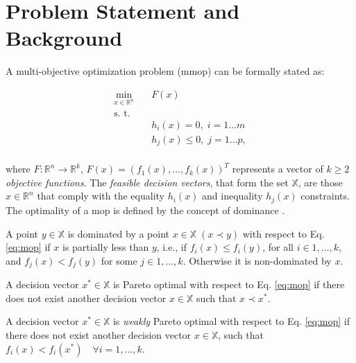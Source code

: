 \section{Problem Statement and Background}
\label{sec:background}

A multi-objective optimization problem (\gls{mmop}) can be formally stated as:

\begin{equation}
	\begin{aligned}
	\underset{x \in \mathbb{R}^n}{\text{min}}
	& \quad F(x)\\
	\text{s. t.} \\
	& \quad h_i(x) = 0, \; i = 1 \ldots m\\
	& \quad h_j(x) \leq 0, \; j = 1 \ldots p,\\
	\end{aligned}
	\label{eq:mop}
\end{equation}

\noindent where $F:\mathbb{R}^n \rightarrow \mathbb{R}^k$, $F(x) = (f_1(x), \ldots,f_k(x))^T$ represents a vector of $k \geq 2$ \emph{objective functions}. The \emph{feasible decision vectors}, that form the set $\mathbb{X}$, are those $x \in \mathbb{R}^{n}$ that comply with the equality $h_i(x)$ and inequality $h_j(x)$ constraints.\\

The optimality of a \gls{mop} is defined by the concept of dominance \cite{pareto_set}.

\begin{mydef}
A point $y \in \mathbb{X}$ is dominated by a point  $x \in \mathbb{X} \; (x \prec y)$ with respect to Eq. \eqref{eq:mop} if $x$ is partially less than $y$, i.e., if $f_{i}(x) \leq f_{i}(y)$, for all $i \in 1, \ldots, k$, and $f_{j}(x) < f_{j}(y)$ for some $j \in 1, \ldots, k$. Otherwise it is non-dominated by $x$. 
\end{mydef}

\begin{mydef}
A decision vector $x^{*} \in \mathbb{X}$ is Pareto optimal with respect to Eq. \eqref{eq:mop} if there does not exist another decision vector $x \in \mathbb{X}$ such that  $x \prec x^{*}$.
\end{mydef}

\begin{mydef}
A decision vector $x^{*} \in \mathbb{X}$ is \emph{weakly} Pareto optimal with respect to Eq. \eqref{eq:mop} if there does not exist another decision vector $x \in \mathbb{X}$, such that  $f_i(x) < f_i(x^{*}) \quad \forall i = 1, ... , k$.
\end{mydef}

